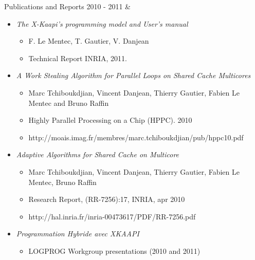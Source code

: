 \documentclass{resume}
\newcommand{\activite}[1]{\textbf{#1}\ }
\begin{document}
\newpage
\begin{rubriquetableau}[3cm]{Publications and Reports}
  \small{2010 - 2011}
  & \activite{}
  \begin{small}
    \begin{itemize}
    \item \textit{The X-Kaapi's programming model and User's manual}
      \begin{itemize}
      \item F. Le Mentec, T. Gautier, V. Danjean
      \item Technical Report INRIA, 2011.
      \end{itemize}

    \item \textit{A Work Stealing Algorithm for Parallel Loops on Shared Cache Multicores}
      \begin{itemize}
      \item Marc Tchiboukdjian, Vincent Danjean, Thierry Gautier, Fabien Le Mentec and Bruno Raffin
      \item Highly Parallel Processing on a Chip (HPPC). 2010
      \item http://moais.imag.fr/membres/marc.tchiboukdjian/pub/hppc10.pdf
      \end{itemize}

    \item \textit{Adaptive Algorithms for Shared Cache on Multicore}
      \begin{itemize}
      \item Marc Tchiboukdjian, Vincent Danjean, Thierry Gautier, Fabien Le Mentec, Bruno Raffin
      \item Research Report, ({RR}-7256):17, INRIA, apr 2010
      \item http://hal.inria.fr/inria-00473617/PDF/RR-7256.pdf
      \end{itemize}

    \item \textit{Programmation Hybride avec XKAAPI}
      \begin{itemize}
      \item LOGPROG Workgroup presentations (2010 and 2011)
      \end{itemize}

    \end{itemize}
  \end{small}
\end{rubriquetableau}
\end{document}
